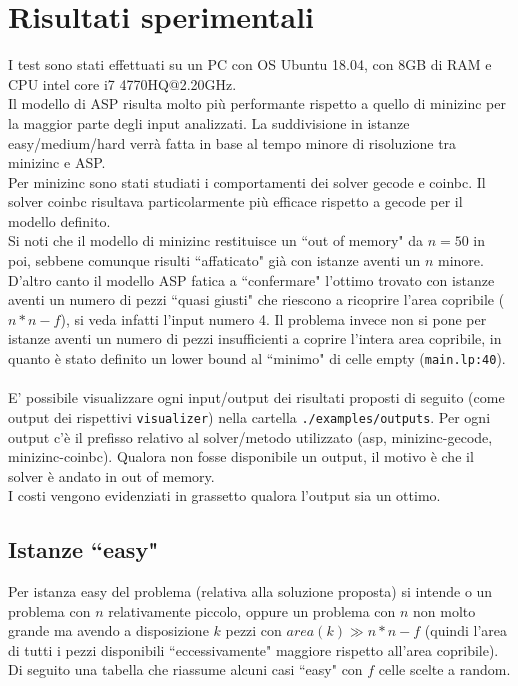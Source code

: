 \documentclass{article}
\begin{document}
\section{Risultati sperimentali}
I test sono stati effettuati su un PC con OS Ubuntu 18.04, con 8GB di RAM e CPU intel core i7 4770HQ@2.20GHz.\\
Il modello di ASP risulta molto più performante rispetto a quello di minizinc per la maggior parte degli input analizzati. La suddivisione in istanze easy/medium/hard verrà fatta in base al tempo minore di risoluzione tra minizinc e ASP.\\
Per minizinc sono stati studiati i comportamenti dei solver gecode e coinbc. Il solver coinbc risultava particolarmente più efficace rispetto a gecode per il modello definito. \\Si noti che il modello di minizinc restituisce un ``out of memory" da $n=50$ in poi, sebbene comunque risulti ``affaticato" già con istanze aventi un $n$ minore.\\
D'altro canto il modello ASP fatica a ``confermare" l'ottimo trovato con istanze aventi un numero di pezzi ``quasi giusti" che riescono a ricoprire l'area copribile ($n*n - f$), si veda infatti l'input numero 4. Il problema invece non si pone per istanze aventi un numero di pezzi insufficienti a coprire l'intera area copribile, in quanto è stato definito un lower bound al ``minimo" di celle empty (\texttt{main.lp:40}).\\\\
E' possibile visualizzare ogni input/output dei risultati proposti di seguito (come output dei rispettivi \texttt{visualizer}) nella cartella \texttt{./examples/outputs}. Per ogni output c'è il prefisso relativo al solver/metodo utilizzato (asp, minizinc-gecode, minizinc-coinbc). Qualora non fosse disponibile un output, il motivo è che il solver è andato in out of memory.\\I costi vengono evidenziati in grassetto qualora l'output sia un ottimo.

\subsection{Istanze ``easy"}
Per istanza easy del problema (relativa alla soluzione proposta) si intende o un problema con $n$ relativamente piccolo, oppure un problema con $n$ non molto grande ma avendo a disposizione $k$ pezzi con $area(k) \gg n*n-f$ (quindi l'area di tutti i pezzi disponibili ``eccessivamente" maggiore rispetto all'area copribile). Di seguito una tabella che riassume alcuni casi ``easy" con $f$ celle scelte a random.\\
\end{document}
